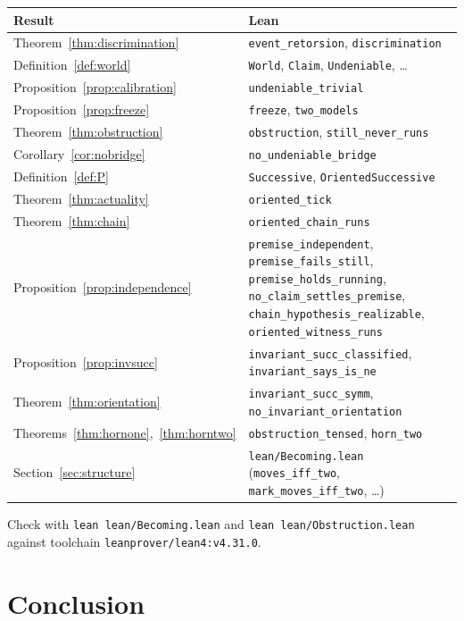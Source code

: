 \documentclass[11pt]{article}
\newcommand{\lf}[1]{\texttt{#1}}
\begin{document}
\begin{center}
\begin{tabular}{@{}ll@{}}
\hline
Result & Lean \\
\hline
Theorem~\ref{thm:discrimination} & \lf{event\_retorsion}, \lf{discrimination} \\
Definition~\ref{def:world} & \lf{World}, \lf{Claim}, \lf{Undeniable}, \ldots \\
Proposition~\ref{prop:calibration} & \lf{undeniable\_trivial} \\
Proposition~\ref{prop:freeze} & \lf{freeze}, \lf{two\_models} \\
Theorem~\ref{thm:obstruction} & \lf{obstruction}, \lf{still\_never\_runs} \\
Corollary~\ref{cor:nobridge} & \lf{no\_undeniable\_bridge} \\
Definition~\ref{def:P} & \lf{Successive}, \lf{OrientedSuccessive} \\
Theorem~\ref{thm:actuality} & \lf{oriented\_tick} \\
Theorem~\ref{thm:chain} & \lf{oriented\_chain\_runs} \\
Proposition~\ref{prop:independence} & \lf{premise\_independent},
  \lf{premise\_fails\_still}, \lf{premise\_holds\_running},
  \lf{no\_claim\_settles\_premise}, \lf{chain\_hypothesis\_realizable},
  \lf{oriented\_witness\_runs} \\
Proposition~\ref{prop:invsucc} & \lf{invariant\_succ\_classified},
  \lf{invariant\_says\_is\_ne} \\
Theorem~\ref{thm:orientation} & \lf{invariant\_succ\_symm}, \lf{no\_invariant\_orientation} \\
Theorems~\ref{thm:hornone},~\ref{thm:horntwo} & \lf{obstruction\_tensed}, \lf{horn\_two} \\
Section~\ref{sec:structure} & \lf{lean/Becoming.lean}
  (\lf{moves\_iff\_two}, \lf{mark\_moves\_iff\_two}, \ldots) \\
\hline
\end{tabular}
\end{center}

\vspace{0.5em}
\noindent
Check with \lf{lean lean/Becoming.lean} and \lf{lean lean/Obstruction.lean}
against toolchain \lf{leanprover/lean4:v4.31.0}.

\section{Conclusion}
\label{sec:conclusion}
\end{document}
